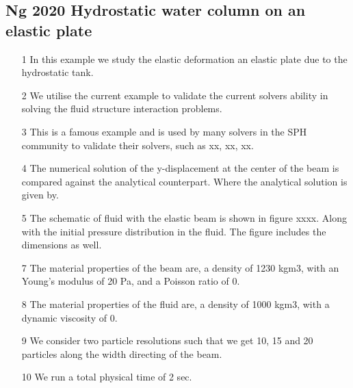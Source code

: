 \documentclass[10pt, conference]{FMFP2022}
\begin{document}
\subsection{Ng 2020 Hydrostatic water column on an elastic plate}
\label{sec:hydrostatic-water-column-on-an-composite-elastic-plate}

\begin{itemize}
\item [1] In this example we study the elastic deformation an elastic plate
  due to the hydrostatic tank.
\item [2] We utilise the current example to validate the current solvers ability
  in solving the fluid structure interaction problems.
\item [3] This is a famous example and is used by many solvers in the SPH
  community to validate their solvers, such as xx, xx, xx.
\item [4] The numerical solution of the y-displacement at the center of the beam
  is compared against the analytical counterpart. Where the analytical solution
  is given by.
\item [5] The schematic of fluid with the elastic beam is shown in figure xxxx.
  Along with the initial pressure distribution in the fluid.
  The figure includes the dimensions as well.
\item [7] The material properties of the beam are, a density of 1230 kgm3, with
  an Young's modulus of 20 Pa, and a Poisson ratio of 0.
\item [8] The material properties of the fluid are, a density of 1000 kgm3, with
  a dynamic viscosity of 0.
\item [9] We consider two particle resolutions such that we get 10, 15 and 20
  particles along the width directing of the beam.
\item [10] We run a total physical time of 2 sec.
\end{itemize}
\end{document}

